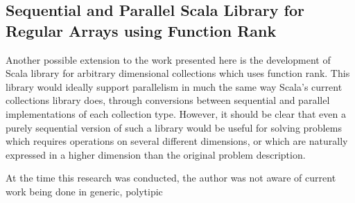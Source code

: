 \subsection{Sequential and Parallel Scala Library for Regular Arrays using Function Rank}
Another possible extension to the work presented here 
is the development of Scala library for arbitrary dimensional collections which uses function rank. 
This library would ideally support parallelism in much the same way 
Scala's current collections library does\cite{pc},
through conversions between sequential and parallel implementations of each collection type. 
However, it should be clear that even 
a purely sequential version of such a library would be useful 
for solving problems which requires operations on several different dimensions, 
or which are naturally expressed in a higher dimension than the original problem description.

At the time this research was conducted, 
the author was not aware of current work being done in generic, polytipic
